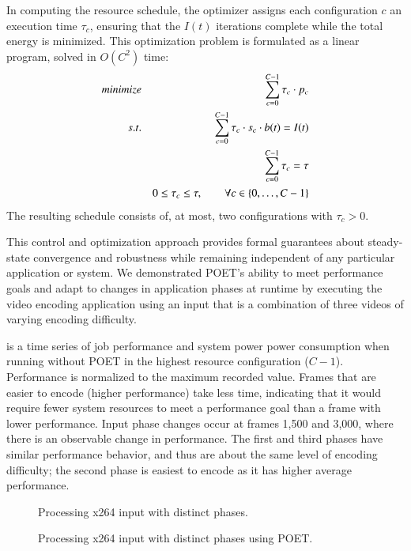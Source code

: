 In computing the resource schedule, the optimizer assigns each configuration $c$ an execution time $\tau_c$, ensuring that the $I(t)$ iterations complete while the total energy is minimized.
This optimization problem is formulated as a linear program, solved in $O(C^2)$ time:
\begin{eqnarray}
\minimize && \sum_{c=0}^{C-1} \tau_c \cdot p_c \label{eqn:poet-power} \\
\st %
&& \sum_{c=0}^{C-1} \tau_c \cdot s_c \cdot b(t) =  I(t) \label{eqn:poet-work} \\
&& \sum_{c=0}^{C-1} \tau_c =  \tau \label{eqn:poet-deadline} \\
&& 0 \le \tau_c \le \tau, \qquad \forall c \in \{0,\ldots,C-1\} \label{eqn:poet-time}
\end{eqnarray}
The resulting schedule consists of, at most, two configurations with $\tau_c > 0$.

This control and optimization approach provides formal guarantees about steady-state convergence and robustness while remaining independent of any particular application or system.
We demonstrated POET's ability to meet performance goals and adapt to changes in application phases at runtime by executing the  video encoding application using an input that is a combination of three videos of varying encoding difficulty.

 is a time series of job performance and system power power consumption when running  without POET in the highest resource configuration ($C-1$).
Performance is normalized to the maximum recorded value.
Frames that are easier to encode (higher performance) take less time, indicating that it would require fewer system resources to meet a performance goal than a frame with lower performance.
Input phase changes occur at frames 1,500 and 3,000, where there is an observable change in performance.
The first and third phases have similar performance behavior, and thus are about the same level of encoding difficulty; the second phase is easiest to encode as it has higher average performance.

\begin{figure}[t]
  
  \caption{Processing x264 input with distinct phases.}
  \label{fig:poet-phases-default}
\end{figure}

\begin{figure}[t]
  
  \caption{Processing x264 input with distinct phases using POET.}
  \label{fig:poet-phases-x264}
\end{figure}

